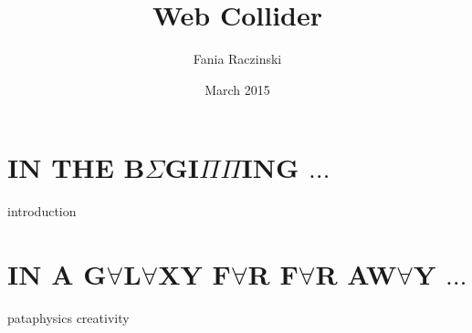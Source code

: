 \documentclass[oneside]{thesis}
\title{Web Collider}
\author{Fania Raczinski}
\date{March 2015}
\begin{document}
\pagestyle{empty}
\listoftodos
\clearpage


\pagestyle{plain}
\frontmatter


{}
\setcounter{tocdepth}{4}
\tableofcontents
\clearpage

{}
\listoffigures
\clearpage

{}
\listoftables
\clearpage

{}
\printnoidxglossary[type=acronym]
\clearpage


\pagestyle{fancy}
\mainmatter

\part{\texorpdfstring{IN THE B$\Sigma$GI$\Pi$$\Pi$ING $\ldots$}{IN THE BEGINNING...}}
{introduction}

\part{\texorpdfstring{IN A G$\forall$L$\forall$XY F$\forall$R F$\forall$R AW$\forall$Y $\ldots$}{IN A GALAXY FAR FAR AWAY...}}
{pataphysics}
{creativity}
\end{document}
